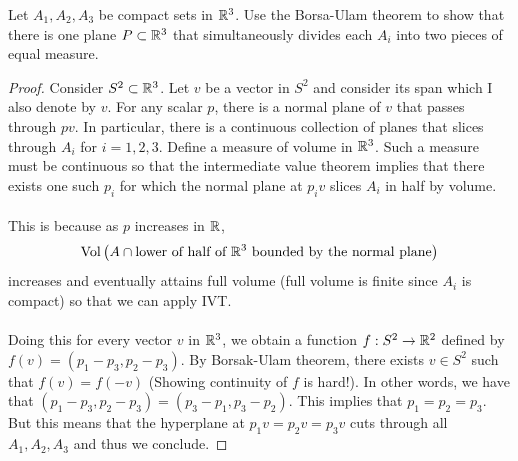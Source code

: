 \documentclass[a4paper]{article}
\begin{document}
\begin{ex}{}{} Let $A_1,A_2,A_3$ be compact sets in $\mathbb{R}^3$. Use the Borsa-Ulam theorem to show that there is one plane $P\subset\mathbb{R}^3$ that simultaneously divides each $A_i$ into two pieces of equal measure. \tcbline
\begin{proof}
Consider $S^2\subset\mathbb{R}^3$. Let $v$ be a vector in $S^2$ and consider its span which I also denote by $v$. For any scalar $p$, there is a normal plane of $v$ that passes through $pv$. In particular, there is a continuous collection of planes that slices through $A_i$ for $i=1,2,3$. Define a measure of volume in $\mathbb{R}^3$. Such a measure must be continuous so that the intermediate value theorem implies that there exists one such $p_i$ for which the normal plane at $p_iv$ slices $A_i$ in half by volume. \\~\\

This is because as $p$ increases in $\mathbb{R}$, $$\text{Vol}\left(A\cap\text{lower of half of }\mathbb{R}^3\text{ bounded by the normal plane}\right)$$ increases and eventually attains full volume (full volume is finite since $A_i$ is compact) so that we can apply IVT. \\~\\

Doing this for every vector $v$ in $\mathbb{R}^3$, we obtain a function $f:S^2\to\mathbb{R}^2$ defined by $f(v)=(p_1-p_3,p_2-p_3)$. By Borsak-Ulam theorem, there exists $v\in S^2$ such that $f(v)=f(-v)$ (Showing continuity of $f$ is hard!). In other words, we have that $(p_1-p_3,p_2-p_3)=(p_3-p_1,p_3-p_2)$. This implies that $p_1=p_2=p_3$. But this means that the hyperplane at $p_1v=p_2v=p_3v$ cuts through all $A_1,A_2,A_3$ and thus we conclude. 
\end{proof}
\end{ex}
\end{document}
